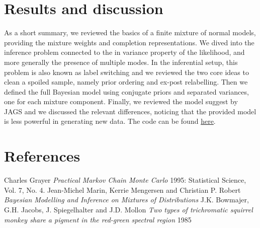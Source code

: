 \documentclass{article}
\begin{document}
\section{Results and discussion}
As a short summary, we reviewed the basics of a finite mixture of normal models, providing the mixture weights and completion representations. We dived into the inference problem connected to the in variance property of the likelihood, and more generally the presence of multiple modes. In the inferential setup, this problem is also known as label switching and we reviewed the two core ideas to clean a spoiled sample, namely prior ordering and ex-post relabelling. Then we defined the full Bayesian model using conjugate priors and separated variances, one for each mixture component. Finally, we reviewed the model suggest by JAGS and we discussed the relevant differences, noticing that the provided model is less powerful in generating new data. The code can be found \href{https://github.com/d3sm0/mixgauss}{here}.

\section{References}
\begin{reference}
     Charles Grayer {\em Practical Markov Chain Monte Carlo} 
    1995: Statistical Science, Vol. 7, No. 4.
     Jean-Michel Marin, Kerrie Mengersen and Christian P. Robert {\em
    Bayesian Modelling and Inference on Mixtures of Distributions}
     J.K. Bowmajer, G.H. Jacobs, J. Spiegelhalter and J.D. Mollon{\em
    Two types of trichromatic squirrel monkey share a pigment in the red-green spectral region}
    1985
\end{reference}
\end{document}

